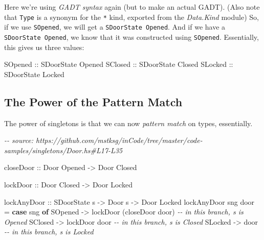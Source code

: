 \documentclass[]{article}
\newenvironment{Shaded}{}{}
\newcommand{\CommentTok}[1]{\textcolor[rgb]{0.38,0.63,0.69}{\textit{#1}}}
\newcommand{\DataTypeTok}[1]{\textcolor[rgb]{0.56,0.13,0.00}{#1}}
\newcommand{\KeywordTok}[1]{\textcolor[rgb]{0.00,0.44,0.13}{\textbf{#1}}}
\newcommand{\NormalTok}[1]{#1}
\newcommand{\OtherTok}[1]{\textcolor[rgb]{0.00,0.44,0.13}{#1}}
\begin{document}
Here we're using \emph{GADT syntax} again (but to make an actual GADT). (Also
note that \texttt{Type} is a synonym for the \texttt{*} kind, exported from the
\emph{Data.Kind} module) So, if we use \texttt{SOpened}, we will get a
\texttt{SDoorState\ \textquotesingle{}Opened}. And if we have a
\texttt{SDoorState\ \textquotesingle{}Opened}, we know that it was constructed
using \texttt{SOpened}. Essentially, this gives us three values:

\begin{Shaded}
\begin{Highlighting}[]
\DataTypeTok{SOpened}\OtherTok{ ::} \DataTypeTok{SDoorState} \DataTypeTok{\textquotesingle{}Opened}
\DataTypeTok{SClosed}\OtherTok{ ::} \DataTypeTok{SDoorState} \DataTypeTok{\textquotesingle{}Closed}
\DataTypeTok{SLocked}\OtherTok{ ::} \DataTypeTok{SDoorState} \DataTypeTok{\textquotesingle{}Locked}
\end{Highlighting}
\end{Shaded}

\hypertarget{the-power-of-the-pattern-match}{%
\subsection{The Power of the Pattern
Match}\label{the-power-of-the-pattern-match}}

The power of singletons is that we can now \emph{pattern match} on types,
essentially.

\begin{Shaded}
\begin{Highlighting}[]
\CommentTok{{-}{-} source: https://github.com/mstksg/inCode/tree/master/code{-}samples/singletons/Door.hs\#L17{-}L35}

\OtherTok{closeDoor ::} \DataTypeTok{Door} \DataTypeTok{\textquotesingle{}Opened} \OtherTok{{-}>} \DataTypeTok{Door} \DataTypeTok{\textquotesingle{}Closed}

\OtherTok{lockDoor ::} \DataTypeTok{Door} \DataTypeTok{\textquotesingle{}Closed} \OtherTok{{-}>} \DataTypeTok{Door} \DataTypeTok{\textquotesingle{}Locked}

\OtherTok{lockAnyDoor ::} \DataTypeTok{SDoorState}\NormalTok{ s }\OtherTok{{-}>} \DataTypeTok{Door}\NormalTok{ s }\OtherTok{{-}>} \DataTypeTok{Door} \DataTypeTok{\textquotesingle{}Locked}
\NormalTok{lockAnyDoor sng door }\OtherTok{=} \KeywordTok{case}\NormalTok{ sng }\KeywordTok{of}
    \DataTypeTok{SOpened} \OtherTok{{-}>}\NormalTok{ lockDoor (closeDoor door) }\CommentTok{{-}{-} in this branch, s is \textquotesingle{}Opened}
    \DataTypeTok{SClosed} \OtherTok{{-}>}\NormalTok{ lockDoor door             }\CommentTok{{-}{-} in this branch, s is \textquotesingle{}Closed}
    \DataTypeTok{SLocked} \OtherTok{{-}>}\NormalTok{ door                      }\CommentTok{{-}{-} in this branch, s is \textquotesingle{}Locked}
\end{Highlighting}
\end{Shaded}
\end{document}
